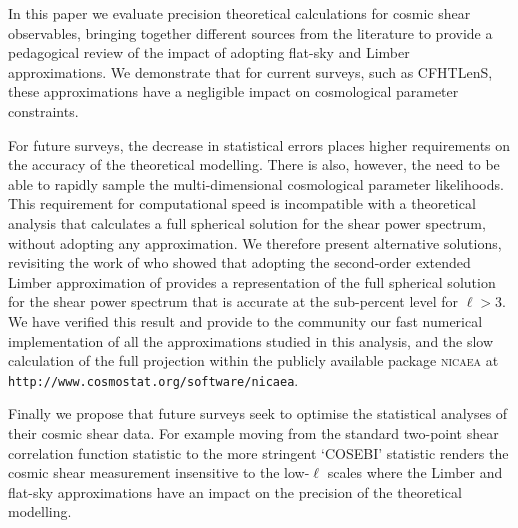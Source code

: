 In this paper we evaluate precision theoretical calculations for cosmic shear observables, bringing together different sources from the literature to provide a pedagogical review of the impact of adopting flat-sky and Limber approximations.  We demonstrate that for current surveys, such as CFHTLenS, these approximations have a negligible impact on cosmological parameter constraints.

For future surveys, the decrease in statistical errors places higher requirements on the accuracy of the theoretical modelling.    There is also, however, the need to be able to rapidly sample the multi-dimensional cosmological parameter likelihoods.  This requirement for computational speed is incompatible with a theoretical analysis that calculates a full spherical solution for the shear power spectrum, without adopting any approximation.  We therefore present alternative solutions, revisiting the work of  \citet{2012PhRvD..86b3001B} who showed that adopting the second-order extended Limber approximation of \citet{2008PhRvD..78l3506L} provides a representation of the full spherical solution for the shear power spectrum that is accurate at the sub-percent level for $\ell > 3$.    We have verified this result and provide to the community our fast numerical implementation of all the approximations studied in this analysis,
and the slow calculation of the full projection within the publicly available package \textsc{nicaea} at \texttt{http://www.cosmostat.org/software/nicaea}.

Finally we propose that future surveys seek to optimise the statistical analyses of their cosmic shear data.  For example moving from the standard two-point shear correlation function statistic to the more stringent `COSEBI' statistic \citep{COSEBIs} renders the cosmic shear measurement insensitive to the low-$\ell$ scales where the Limber and flat-sky approximations have an impact on the precision of the theoretical modelling.  

